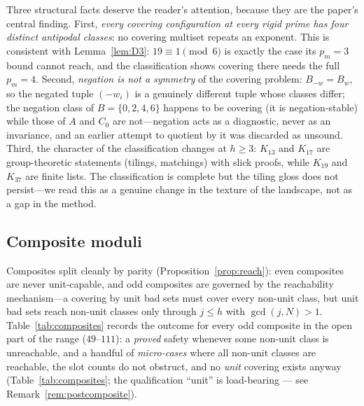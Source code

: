\begin{remark}\label{rem:pattern}
Three structural facts deserve the reader's attention, because they are
the paper's central finding. First, \emph{every covering configuration at
every rigid prime has four distinct antipodal classes}: no covering
multiset repeats an exponent. This is consistent with
Lemma~\ref{lem:D3}: $19\equiv 1\pmod 6$ is exactly the case its $p_m=3$
bound cannot reach, and the classification shows covering there needs the
full $p_m=4$. Second, \emph{negation is not a symmetry} of the covering
problem: $B_{-w}=B_w$, so the negated tuple $(-w_i)$ is a genuinely
different tuple whose classes differ; the negation class of $B=\{0,2,4,6\}$
happens to be covering (it is negation-stable) while those of $A$ and
$C_0$ are not---negation acts as a diagnostic, never as an invariance,
and an earlier attempt to quotient by it was discarded as unsound. Third,
the character of the classification changes at $h\ge 3$: $K_{13}$ and
$K_{17}$ are group-theoretic statements (tilings, matchings) with slick
proofs, while $K_{19}$ and $K_{37}$ are finite lists. The classification
is complete but the tiling gloss does not persist---we read this as a
genuine change in the texture of the landscape, not as a gap in the
method.
\end{remark}

\subsection{Composite moduli}\label{sec:composites}

Composites split cleanly by parity (Proposition~\ref{prop:reach}): even
composites are never unit-capable, and odd composites are governed by the
reachability mechanism---a covering by unit bad sets must cover every
non-unit class, but unit bad sets reach non-unit classes only through
$j\le h$ with $\gcd(j,N)>1$. Table~\ref{tab:composites} records the
outcome for every odd composite in the open part of the range
($49$--$111$): a \emph{proved} safety whenever some non-unit class is
unreachable, and a handful of \emph{micro-cases} where all non-unit
classes are reachable, the slot counts do not obstruct, and no \emph{unit}
covering exists anyway (Table~\ref{tab:composites}; the qualification
``unit'' is load-bearing --- see Remark~\ref{rem:postcomposite}).

